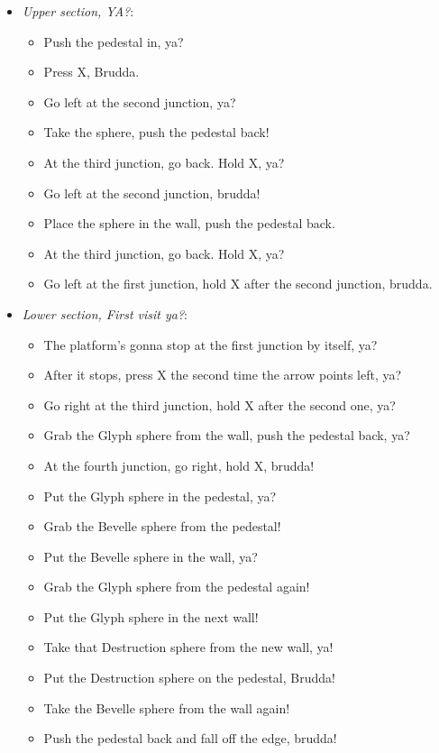 \begin{trial}
\begin{itemize}
\item \textit{Upper section, YA?}:
\begin{itemize}
\item Push the pedestal in, ya?
\item Press X, Brudda.
\item Go left at the second junction, ya?
\item Take the sphere, push the pedestal back!
\item At the third junction, go back. Hold X, ya?
\item Go left at the second junction, brudda!
\item Place the sphere in the wall, push the pedestal back.
\item At the third junction, go back. Hold X, ya?
\item Go left at the first junction, hold X after the second junction, brudda.
\end{itemize}
\item \textit{Lower section, First visit ya?}:
\begin{itemize}
\item The platform's gonna stop at the first junction by itself, ya?
\item After it stops, press X the second time the arrow points left, ya?
\item Go right at the third junction, hold X after the second one, ya?
\item Grab the Glyph sphere from the wall, push the pedestal back, ya?
\item At the fourth junction, go right, hold X, brudda!
\item Put the Glyph sphere in the pedestal, ya?
\item Grab the Bevelle sphere from the pedestal!
\item Put the Bevelle sphere in the wall, ya?
\item Grab the Glyph sphere from the pedestal again!
\item Put the Glyph sphere in the next wall!
\item Take that Destruction sphere from the new wall, ya!
\item Put the Destruction sphere on the pedestal, Brudda!
\item Take the Bevelle sphere from the wall again!
\item Push the pedestal back and fall off the edge, brudda!
\end{itemize}

\end{itemize}
\end{trial}
